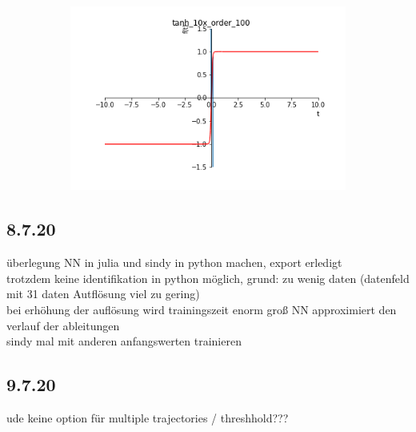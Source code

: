 \documentclass[arbeit=studie,oneside,BCOR=12mm]{ArbeitRST}
\begin{document}
\begin{figure}[ht]
\begin{subfigure}[c]{0.5\textwidth}
\end{subfigure}
\begin{subfigure}[c]{0.5\textwidth}
\centering
\includegraphics[width=1\textwidth]{images/tanh_10x_order_100}

\end{subfigure}
\end{figure}


\subsection{8.7.20} 
überlegung NN in julia und sindy in python machen, export erledigt\\
trotzdem keine identifikation in python möglich, grund: zu wenig daten (datenfeld mit 31 daten Autflösung viel zu gering)\\
bei erhöhung der auflösung wird trainingszeit enorm groß
NN approximiert den verlauf der ableitungen	\\
sindy mal mit anderen anfangswerten trainieren
\subsection{9.7.20}
ude keine option für multiple trajectories / threshhold???
\end{document}
